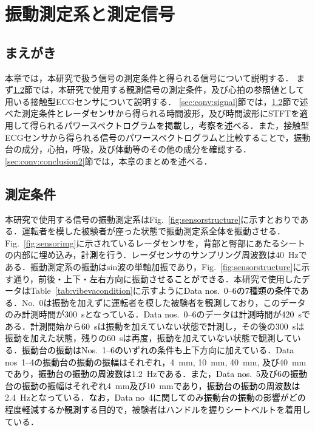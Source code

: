 \chapter{振動測定系と測定信号}
\label{chap:measurementstructsig}

\section{まえがき}
本章では，本研究で扱う信号の測定条件と得られる信号について説明する．
{まず\ref{sec:conv:measurementcondition}節では，本研究で使用する観測信号の測定条件，及び心拍\textcolor{black}{の参照値}として用いる接触型ECGセンサについて説明する．
\ref{sec:conv:signal}節では，\ref{sec:conv:measurementcondition}節で述べた測定条件\textcolor{black}{とレーダセンサ}から得られる時間波形，及び時間波形にSTFTを適用して得られるパワースペクトログラム\textcolor{black}{を掲載し，考察を述べる}．また，接触型ECGセンサから得られる信号のパワースペクトログラムと比較することで\textcolor{black}{，}振動台の成分，心拍，呼吸，及び体動等のその他の成分を確認する．
\ref{sec:conv:conclusion2}節では，本章のまとめを述べる．}

\section{測定条件}
\label{sec:conv:measurementcondition}
		本研究で使用する信号の{振動測定系}はFig.~\ref{fig:sensorstructure}に示すとおりである．{運転者を模した}被験者が座った状態で{振動測定系}全体を振動させる．Fig.~\ref{fig:sensorimg}に示されている{レーダセンサ}を，{背部と臀部にあたるシートの内部に埋め込み}，\textcolor{black}{計測}を行う．レーダセンサのサンプリング周波数は40~Hzである．{振動測定系の振動はsin波の単軸加振であり，Fig.~\ref{fig:sensorstructure}に示す通り，前後・上下・左右方向に振動\textcolor{black}{させることができる}．本研究で使用したデータはTable~\ref{tab:vibevacondition}に示すように\textcolor{black}{Data nos.~0--6の7種類の条件である}．No.~0は振動を加えずに運転者を模した被験者を観測しており，このデータのみ\textcolor{black}{計測}時間が\textcolor{black}{300~s}となっている．\textcolor{black}{Data nos.~0--6}のデータは\textcolor{black}{計測}時間が\textcolor{black}{420~s}である．\textcolor{black}{計測}開始から\textcolor{black}{60~s}は振動を加えていない状態で\textcolor{black}{計測}し，その後の\textcolor{black}{300~s}は振動を加えた状態，残りの\textcolor{black}{60~s}は再度，振動を加えていない状態で観測している．\textcolor{black}{振動台の振動はNos.~1--6のいずれの条件も}上下方向に加えている．\textcolor{black}{Data nos~1--4}の\textcolor{black}{振動台の振動の振幅}はそれぞれ，4~mm, 10~mm, 40~mm, \textcolor{black}{及び}40~mm\textcolor{black}{であり，振動台の振動の周波数は}1.2~Hz\textcolor{black}{である．また，Data nos.~5及び6}の\textcolor{black}{振動台の振動の振幅}はそれぞれ4~mm\textcolor{black}{及び}10~mm\textcolor{black}{であり，振動台の振動の周波数は}2.4~Hzとなっている．\textcolor{black}{なお}，\textcolor{black}{Data no~4に関してのみ振動台の振動}の\textcolor{black}{影響がどの程度軽減するか観測する目的で，}被験者はハンドルを握りシートベルトを着用している．}

